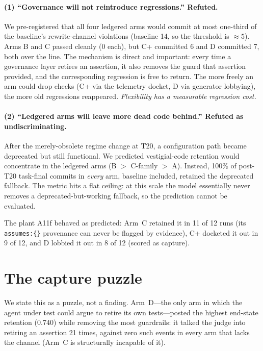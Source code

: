 \documentclass[11pt]{article}
\begin{document}
\paragraph{(1) ``Governance will not reintroduce regressions.'' Refuted.} We
pre-registered that all four ledgered arms would commit at most one-third of
the baseline's rewrite-channel violations (baseline 14, so the threshold is
$\approx 5$). Arms B and C passed cleanly (0 each), but C+ committed 6 and D
committed 7, both over the line. The mechanism is direct and important: every
time a governance layer retires an assertion, it also removes the guard that
assertion provided, and the corresponding regression is free to return. The
more freely an arm could drop checks (C+ via the telemetry docket, D via
generator lobbying), the more old regressions reappeared. \emph{Flexibility
has a measurable regression cost.}

\paragraph{(2) ``Ledgered arms will leave more dead code behind.'' Refuted as
undiscriminating.} After the merely-obsolete regime change at T20, a
configuration path became deprecated but still functional. We predicted
vestigial-code retention would concentrate in the ledgered arms (B $>$
C-family $>$ A). Instead, 100\% of post-T20 task-final commits in
\emph{every} arm, baseline included, retained the deprecated fallback. The
metric hits a flat ceiling: at this scale the model essentially never removes
a deprecated-but-working fallback, so the prediction cannot be evaluated.

The plant A11f behaved as predicted: Arm~C retained it in 11 of 12 runs (its
\texttt{assumes:\{\}} provenance can never be flagged by evidence), C+
docketed it out in 9 of 12, and D lobbied it out in 8 of 12 (scored as
capture).

\section{The capture puzzle}
\label{sec:puzzle}

We state this as a puzzle, not a finding. Arm~D---the only arm in which the
agent under test could argue to retire its own tests---posted the highest
end-state retention (0.740) while removing the most guardrails: it talked the
judge into retiring an assertion 21 times, against zero such events in every
arm that lacks the channel (Arm~C is structurally incapable of it).
\end{document}
